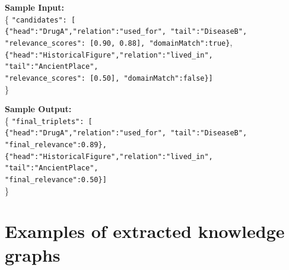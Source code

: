 \documentclass{article}
\begin{document}
\begin{tcolorbox}[colframe=black!25, colback=black!5, boxrule=0.5pt, arc=2pt]
\vspace{1mm}
\noindent
\textbf{Sample Input:}\\
\{
  \texttt{"candidates": [}\\
  \quad \texttt{\{"head":"DrugA","relation":"used\_for",
  "tail":"DiseaseB",}\\
  \quad \quad \texttt{"relevance\_scores": [0.90, 0.88], "domainMatch":true\}},\\
    \quad \texttt{\{"head":"HistoricalFigure","relation":"lived\_in",
  "tail":"AncientPlace",}\\
  \quad \quad \texttt{"relevance\_scores": [0.50], "domainMatch":false\}]}\\
\}

\vspace{1mm}
\noindent
\textbf{Sample Output:}\\
\{
  \texttt{"final\_triplets": [}\\
  \quad \texttt{\{"head":"DrugA","relation":"used\_for",
  "tail":"DiseaseB",}\\
  \quad \quad \texttt{"final\_relevance":0.89\},}\\
    \quad \texttt{\{"head":"HistoricalFigure","relation":"lived\_in",
  "tail":"AncientPlace",}\\
  \quad \quad \texttt{"final\_relevance":0.50\}]}\\
\}
\end{tcolorbox}
\newpage

\section{Examples of extracted knowledge graphs}
\end{document}
